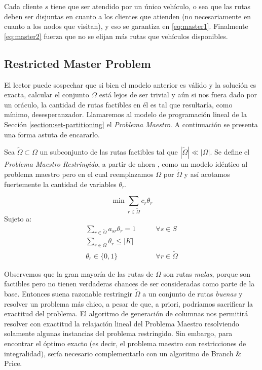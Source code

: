 Cada cliente $s$ tiene que ser atendido por un único vehículo, o sea que las rutas deben ser disjuntas en cuanto a los clientes que atienden (no necesariamente en cuanto a los nodos que visitan), y eso se garantiza en \ref{eq:master1}. Finalmente \ref{eq:master2} fuerza que no se elijan más rutas que vehículos disponibles.

\subsection{Restricted Master Problem}
\label{section:rmp}

El lector puede sospechar que si bien el modelo anterior es válido y la solución es exacta, calcular el conjunto $\Omega$ está lejos de ser trivial y aún si nos fuera dado por un oráculo, la cantidad de rutas factibles en él es tal que resultaría, como mínimo, desesperanzador. Llamaremos al modelo de programación lineal de la Sección \ref{section:set-partitioning} el \emph{Problema Maestro}. A continuación se presenta una forma astuta de encararlo.

Sea $\tilde{\Omega} \subset \Omega$ un subconjunto de las rutas factibles  tal que $|\tilde{\Omega}| \ll |\Omega|$. Se define el \emph{Problema Maestro Restringido}, a partir de ahora , como un modelo idéntico al problema maestro pero en el cual reemplazamos $\Omega$ por $\tilde{\Omega}$ y así acotamos fuertemente la cantidad de variables $\theta_r$. 

\begin{equation}
    \min \sum_{r \in \tilde{\Omega}} c_r  \theta_r
\end{equation}
Sujeto a:
\begin{align}
    \sum_{r \in \tilde{\Omega}} {a_{sr}\theta_r} = 1
\qquad & \forall {s \in S} \label{eq:rmp1} \\
\sum_{r \in \tilde{\Omega}}{\theta_r} \leq |K| & \label{eq:rmp2} \\
\theta_r \in \{0, 1\} \qquad & \forall{r \in \tilde{\Omega}}
\end{align}

Observemos que la gran mayoría de las rutas de $\Omega$ son rutas \emph{malas}, porque son factibles pero no tienen verdaderas chances de ser consideradas como parte de la base. Entonces suena razonable restringir $\tilde{\Omega}$ a un conjunto de rutas \emph{buenas} y resolver un problema más chico, a pesar de que, a priori, podríamos sacrificar la exactitud del problema. El algoritmo de generación de columnas nos permitirá resolver con exactitud la relajación lineal del Problema Maestro resolviendo solamente algunas instancias del problema restringido. Sin embargo, para encontrar el óptimo exacto (es decir, el problema maestro con restricciones de integralidad), sería necesario complementarlo con un algoritmo de Branch \& Price.

